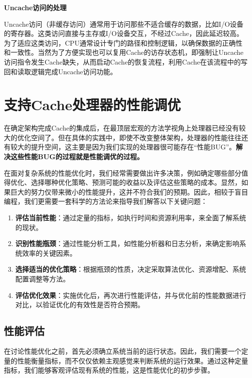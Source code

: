 \textbf{Uncache访问的处理}

Uncache访问（非缓存访问）通常用于访问那些不适合缓存的数据，比如I/O设备的寄存器。这类访问直接与主存或I/O设备交互，不经过Cache，因此延迟较高。为了适应这类访问，CPU通常设计专门的路径和控制逻辑，以确保数据的正确性和一致性。当然为了方便实现也可以复用Cache的访存状态机，即强制让Uncache访问指令发生Cache缺失，从而启动Cache的恢复流程，利用Cache在该流程中的写回和读取逻辑完成Uncache访问功能。

\section{支持Cache处理器的性能调优}\label{sec:09-cache-022}

在确定架构完成Cache的集成后，在最顶层宏观的方法学视角上处理器已经没有较大的优化空间了。但在具体的实践中，即使不改变整体架构，处理器的性能往往还有较大的提升空间，这主要是因为我们实现的处理器很可能存在``性能BUG''。\textbf{解决这些性能BUG的过程就是性能调优的过程。}

在面对复杂系统的性能优化时，我们经常需要做出许多决策，例如确定哪些部分值得优化、选择哪种优化策略、预测可能的收益以及评估这些策略的成本。显然，如果巨大的努力仅带来微小的性能提升，这并不符合我们的预期。因此，相较于盲目编程，我们更需要一套科学的方法论来指导我们解答以下关键问题：

\begin{enumerate}
\def\labelenumi{\arabic{enumi}.}
\tightlist
\item
  \textbf{评估当前性能}：通过定量的指标，如执行时间和资源利用率，来全面了解系统的现状。
\item
  \textbf{识别性能瓶颈}：通过性能分析工具，如性能分析器和日志分析，来确定影响系统效率的关键因素。
\item
  \textbf{选择适当的优化策略}：根据瓶颈的性质，决定采取算法优化、资源增配、系统配置调整等方法。
\item
  \textbf{评估优化效果}：实施优化后，再次进行性能评估，并与优化前的性能数据进行对比，以验证优化的有效性是否符合预期。
\end{enumerate}

\subsection{性能评估}\label{sec:09-cache-023}

在讨论性能优化之前，首先必须确立系统当前的运行状态。因此，我们需要一个定量的性能衡量指标，而不仅仅依赖主观感觉来判断系统的运行效果。通过这种定量指标，我们能够客观评估现有系统的性能，这是性能优化的初步步骤。

